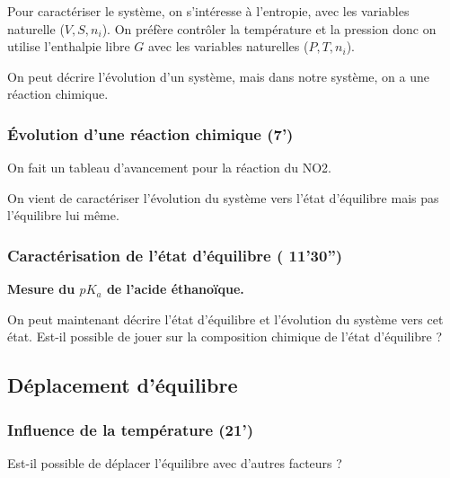 Pour caractériser le système, on s'intéresse à l'entropie, avec les variables naturelle ($V, S, n_i$).
On préfère contrôler la température et la pression donc on utilise l'enthalpie libre $G$ avec les variables naturelles ($P, T, n_i$).

\begin{transition}
On peut décrire l'évolution d'un système, mais dans notre système, on a une réaction chimique.
\end{transition}

\subsubsection{Évolution d'une réaction chimique (7')}

On fait un tableau d'avancement pour la réaction du NO2.


\begin{transition}
On vient de caractériser l'évolution du système vers l'état d'équilibre mais pas l'équilibre lui même.
\end{transition}

\subsubsection{Caractérisation de l'état d'équilibre ( 11'30'')}

\begin{experience}
\textbf{Mesure du $pK_a$ de l'acide éthanoïque.}
\end{experience}


\begin{transition}
On peut maintenant décrire l'état d'équilibre et l'évolution du système vers cet état. Est-il possible de jouer sur la composition chimique de l'état d'équilibre ?
\end{transition}

\subsection{Déplacement d'équilibre}

\subsubsection{Influence de la température (21')}



\begin{transition}
Est-il possible de déplacer l'équilibre avec d'autres facteurs ?
\end{transition}

